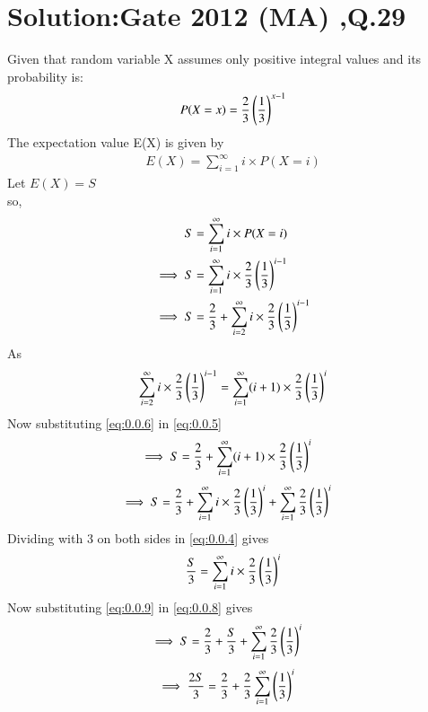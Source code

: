 \documentclass[journal,12pt,twocolumn]{IEEEtran}
\begin{document}
\section*{Solution:Gate 2012 (MA) ,Q.29}
  Given that random variable X  assumes only positive integral values and its probability is:
  \begin{align}
      P(X=x)=\frac{2}{3}\left(\frac{1}{3}\right)^{x-1}
  \end{align}
  The expectation value E(X) is given by 
  \begin{align}
      E(X)=\sum_{i=1}^{\infty} i \times P(X=i)
  \end{align}
  Let $E(X)=S$\\
  so,
  \begin{align}
      S&=\sum_{i=1}^{\infty} i \times P(X=i)\\
    \implies S&=\sum_{i=1}^{\infty} i \times
      \frac{2}{3}\left(\frac{1}{3}\right)^{i-1}\label{eq:0.0.4}\\
     \implies S&=\frac{2}{3}+\sum_{i=2}^{\infty} i \times
      \frac{2}{3}\left(\frac{1}{3}\right)^{i-1}\label{eq:0.0.5}
  \end{align}
  As
  \begin{align}
      \sum_{i=2}^{\infty} i \times
      \frac{2}{3}\left(\frac{1}{3}\right)^{i-1}=\sum_{i=1}^{\infty} (i+1)\times
      \frac{2}{3}\left(\frac{1}{3}\right)^{i}\label{eq:0.0.6}
  \end{align}
  Now substituting  \eqref{eq:0.0.6} in \eqref{eq:0.0.5}
  \begin{align}
      \implies S&=\frac{2}{3}+\sum_{i=1}^{\infty} (i+1) \times
      \frac{2}{3}\left(\frac{1}{3}\right)^{i}
  \end{align}
  \begin{align}
       \implies S&=\frac{2}{3}+\sum_{i=1}^{\infty} i \times
      \frac{2}{3}\left(\frac{1}{3}\right)^{i}+\sum_{i=1}^{\infty} 
      \frac{2}{3}\left(\frac{1}{3}\right)^{i}\label{eq:0.0.8}
  \end{align}
   Dividing with 3 on both sides in \eqref{eq:0.0.4} gives
   \begin{align}
      \frac{S}{3}=\sum_{i=1}^{\infty} i \times
      \frac{2}{3}\left(\frac{1}{3}\right)^{i}\label{eq:0.0.9}
  \end{align}
  Now substituting \eqref{eq:0.0.9} in \eqref{eq:0.0.8} gives
  \begin{align}
     \implies S&=\frac{2}{3}+\frac{S}{3}+\sum_{i=1}^{\infty}\frac{2}{3}\left(\frac{1}{3}\right)^{i}
     \end{align}
     \begin{align}
     \implies \frac{2S}{3}&=\frac{2}{3}+\frac{2}{3}\sum_{i=1}^{\infty}\left(\frac{1}{3}\right)^{i}
  \end{align}
\end{document}
